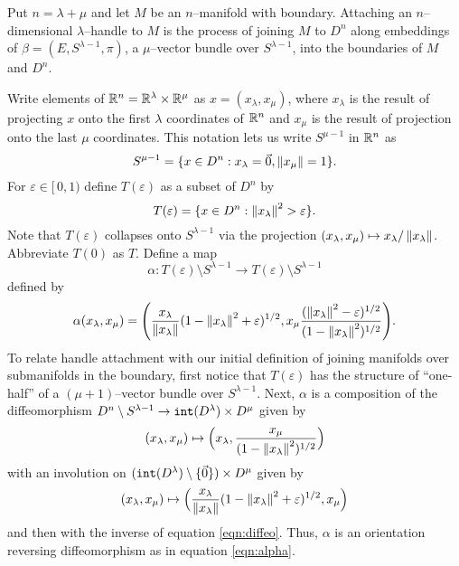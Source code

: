 Put $n=\lambda+\mu$ and let $M$ be an $n$--manifold with boundary.
Attaching an $n$--dimensional $\lambda$--handle to $M$ is the process of joining $M$ to $D^n$ along embeddings of $\beta=(E,S^{\lambda-1},\pi)$, a $\mu$--vector bundle over $S^{\lambda-1}$, into the boundaries of $M$ and $D^n$.

Write elements of $\mathbb{R}^n=\mathbb{R}^\lambda\times\mathbb{R}^\mu$ as $x=(x_\lambda,x_\mu)$, where $x_\lambda$ is the result of projecting $x$ onto the first $\lambda$ coordinates of $\mathbb{R}^n$ and $x_\mu$ is the result of projection onto the last $\mu$ coordinates.
This notation lets us write $S^{\mu-1}$ in $\mathbb{R}^n$ as
\[
	S^{\mu-1} = \{x\in D^n: x_\lambda=\vec{0},\left\lVert x_\mu \right\rVert=1\}.
\]
For $\varepsilon\in [\,0,1)$ define $T(\varepsilon)$ as a subset of $D^n$ by
\[
	T(\varepsilon) = \{x\in D^n: \left\lVert x_\lambda \right\rVert^2>\varepsilon\}.
\]
Note that $T(\varepsilon)$ collapses onto $S^{\lambda-1}$ via the projection $(x_\lambda,x_\mu)\mapsto x_\lambda/\left\lVert x_\lambda \right\rVert$.
Abbreviate $T(0)$ as $T$.
Define a map
\[
	\alpha:T(\varepsilon)\setminus S^{\lambda-1} \to T(\varepsilon)\setminus S^{\lambda-1}
\]
defined by
\begin{equation}
	\alpha(x_\lambda, x_\mu) =
	\Bigg( 
		\frac{x_\lambda}{\left\lVert x_\lambda \right\rVert}
		(1-\left\lVert x_\lambda \right\rVert^2+\varepsilon)^{1/2},
		x_\mu
		\frac{
			(\left\lVert x_\lambda \right\rVert^2-\varepsilon)^{1/2}
		}{
			(1-\left\lVert x_\lambda \right\rVert^2)^{1/2}
		}
	\Bigg).
\end{equation}
To relate handle attachment with our initial definition of joining manifolds over submanifolds in the boundary, first notice that $T(\varepsilon)$ has the structure of ``one-half'' of a $(\mu+1)$--vector bundle over $S^{\lambda-1}$.
Next, $\alpha$ is a composition of the diffeomorphism $D^n\setminus S^{\lambda-1}\to\mathtt{int}(D^\lambda)\times D^\mu$ given by
\begin{equation}
	\label{eqn:diffeo}
	(x_\lambda,x_\mu)\mapsto \Big(x_\lambda,\frac{x_\mu}{(1-\left\lVert x_\lambda \right\rVert^2)^{1/2}}\Big)
\end{equation}
with an involution on $(\mathtt{int}(D^\lambda)\setminus\{\vec{0}\})\times D^\mu$ given by
\begin{equation}
	(x_\lambda,x_\mu)\mapsto \Big(\frac{x_\lambda}{\left\lVert x_\lambda \right\rVert}(1-\left\lVert x_\lambda \right\rVert^2+\varepsilon)^{1/2},x_\mu \Big)
\end{equation}
and then with the inverse of equation \ref{eqn:diffeo}.
Thus, $\alpha$ is an orientation reversing diffeomorphism as in equation \ref{eqn:alpha}.

